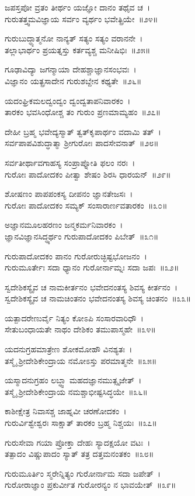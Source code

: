ಜಪಸ್ತಪೋ ವ್ರತಂ ತೀರ್ಥಂ ಯಜ್ಞೋ ದಾನಂ ತಥೈವ ಚ~।\\
ಗುರುತತ್ತ್ವಮವಿಜ್ಞಾಯ ಸರ್ವಂ ವ್ಯರ್ಥಂ ಭವೇತ್ಪ್ರಿಯೇ~॥೨೪॥

ಗುರುಬುದ್ಧ್ಯಾತ್ಮನೋ ನಾನ್ಯತ್ ಸತ್ಯಂ ಸತ್ಯಂ ವರಾನನೇ~।\\
ತಲ್ಲಾಭಾರ್ಥಂ ಪ್ರಯತ್ನಸ್ತು ಕರ್ತವ್ಯಶ್ಚ ಮನೀಷಿಭಿಃ~॥೨೫॥

ಗೂಢಾವಿದ್ಯಾ ಜಗನ್ಮಾಯಾ ದೇಹಶ್ಚಾಜ್ಞಾನಸಂಭವಃ~।\\
ವಿಜ್ಞಾನಂ ಯತ್ಪ್ರಸಾದೇನ ಗುರುಶಬ್ದೇನ ಕಥ್ಯತೇ~॥೨೬॥

ಯದಂಘ್ರಿಕಮಲದ್ವಂದ್ವಂ ದ್ವಂದ್ವತಾಪನಿವಾರಕಂ~।\\
ತಾರಕಂ ಭವಸಿಂಧೋಶ್ಚ ತಂ ಗುರುಂ ಪ್ರಣಮಾಮ್ಯಹಂ~॥೨೭॥

ದೇಹೀ ಬ್ರಹ್ಮ ಭವೇದ್ಯಸ್ಮಾತ್ ತ್ವತ್‌ಕೃಪಾರ್ಥಂ ವದಾಮಿ ತತ್~।\\
ಸರ್ವಪಾಪವಿಶುದ್ಧಾತ್ಮಾ ಶ್ರೀಗುರೋಃ ಪಾದಸೇವನಾತ್~॥೨೮॥

ಸರ್ವತೀರ್ಥಾವಗಾಹಸ್ಯ ಸಂಪ್ರಾಪ್ನೋತಿ ಫಲಂ ನರಃ~।\\
ಗುರೋಃ ಪಾದೋದಕಂ ಪೀತ್ವಾ ಶೇಷಂ ಶಿರಸಿ ಧಾರಯನ್~॥೨೯॥

ಶೋಷಣಂ ಪಾಪಪಂಕಸ್ಯ ದೀಪನಂ ಜ್ಞಾನತೇಜಸಃ~।\\
ಗುರೋಃ ಪಾದೋದಕಂ ಸಮ್ಯಕ್ ಸಂಸಾರಾರ್ಣವತಾರಕಂ~॥೩೦॥

ಅಜ್ಞಾನಮೂಲಹರಣಂ ಜನ್ಮಕರ್ಮನಿವಾರಕಂ~।\\
ಜ್ಞಾನವಿಜ್ಞಾನಸಿದ್ಧ್ಯರ್ಥಂ ಗುರುಪಾದೋದಕಂ ಪಿಬೇತ್~॥೩೧॥

ಗುರುಪಾದೋದಕಂ ಪಾನಂ ಗುರೋರುಚ್ಛಿಷ್ಟಭೋಜನಂ~।\\
ಗುರುಮೂರ್ತೇಃ ಸದಾ ಧ್ಯಾನಂ ಗುರೋರ್ನಾಮ್ನಃ ಸದಾ ಜಪಃ~॥೩೨॥

ಸ್ವದೇಶಿಕಸ್ಯೈವ ಚ ನಾಮಕೀರ್ತನಂ ಭವೇದನಂತಸ್ಯ ಶಿವಸ್ಯ ಕೀರ್ತನಂ~।\\
ಸ್ವದೇಶಿಕಸ್ಯೈವ ಚ ನಾಮಚಿಂತನಂ ಭವೇದನಂತಸ್ಯ ಶಿವಸ್ಯ ಚಿಂತನಂ~॥೩೩॥

ಯತ್ಪಾದರೇಣುರ್ವೈ ನಿತ್ಯಂ ಕೋಽಪಿ ಸಂಸಾರವಾರಿಧೌ~।\\
ಸೇತುಬಂಧಾಯತೇ ನಾಥಂ ದೇಶಿಕಂ ತಮುಪಾಸ್ಮಹೇ~॥೩೪॥

ಯದನುಗ್ರಹಮಾತ್ರೇಣ ಶೋಕಮೋಹೌ ವಿನಶ್ಯತಃ~।\\
ತಸ್ಮೈ ಶ್ರೀದೇಶಿಕೇಂದ್ರಾಯ ನಮೋಽಸ್ತು ಪರಮಾತ್ಮನೇ~॥೩೫॥

ಯಸ್ಮಾದನುಗ್ರಹಂ ಲಬ್ಧ್ವಾ ಮಹದಜ್ಞಾನಮುತ್ಸೃಜೇತ್~।\\
ತಸ್ಮೈ ಶ್ರೀದೇಶಿಕೇಂದ್ರಾಯ ನಮಶ್ಚಾಭೀಷ್ಟಸಿದ್ಧಯೇ~॥೩೬॥

ಕಾಶೀಕ್ಷೇತ್ರ ನಿವಾಸಶ್ಚ ಜಾಹ್ನವೀ ಚರಣೋದಕಂ~।\\
ಗುರುರ್ವಿಶ್ವೇಶ್ವರಃ ಸಾಕ್ಷಾತ್ ತಾರಕಂ ಬ್ರಹ್ಮ ನಿಶ್ಚಯಃ~॥೩೭॥

ಗುರುಸೇವಾ ಗಯಾ ಪ್ರೋಕ್ತಾ ದೇಹಃ ಸ್ಯಾದಕ್ಷಯೋ ವಟಃ~।\\
ತತ್ಪಾದಂ ವಿಷ್ಣುಪಾದಂ ಸ್ಯಾತ್ ತತ್ರ ದತ್ತಮನಂತಕಂ~॥೩೮॥

ಗುರುಮೂರ್ತಿಂ ಸ್ಮರೇನ್ನಿತ್ಯಂ ಗುರೋರ್ನಾಮ ಸದಾ ಜಪೇತ್~।\\
ಗುರೋರಾಜ್ಞಾಂ ಪ್ರಕುರ್ವೀತ ಗುರೋರನ್ಯಂ ನ ಭಾವಯೇತ್~॥೩೯॥

